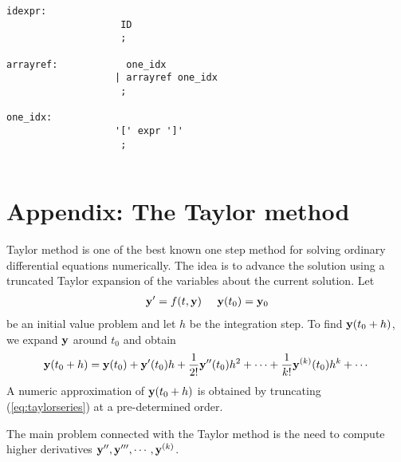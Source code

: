 \documentclass{article}
\begin{document}
{{\begin{verbatim}
idexpr:
                    ID
                    ;

arrayref:            one_idx
                   | arrayref one_idx
                    ;

one_idx: 
                   '[' expr ']'
                    ;
                  
\end{verbatim}
}

\section*{Appendix: The Taylor method}
Taylor method is one of the best known one step method for solving
ordinary differential equations numerically. The idea is to
advance the solution using a truncated Taylor expansion of
the variables about the current solution.
Let
\begin{eqnarray}
\label{eq:ivp}
{\bf y}' = f(t, {\bf y})\;\;\;\;\; {\bf y}(t_0) = {\bf y}_0
\end{eqnarray}
be an initial value problem and let $h$ be the integration
step. To find ${\bf y}(t_0+h)$, we expand ${\bf y}$ around
$t_0$ and obtain
\begin{equation}
\label{eq:taylorseries}
{\bf y}(t_0 +h) = {\bf y}(t_0) + {\bf y}'(t_0) h + {1\over
{2!}} {\bf y}''(t_0) h^2 + \cdots + {1 \over {k!}}{\bf
y}^{(k)}(t_0) h^k + \cdots
\end{equation}
A numeric approximation of ${\bf y}(t_0+h)$
is obtained by truncating (\ref{eq:taylorseries})
at a pre-determined order. 


The main problem connected with the Taylor method
is the need to compute higher derivatives 
${\bf y}'',{\bf y}''',\cdots, {\bf y}^{(k)}$.

}
\end{document}
